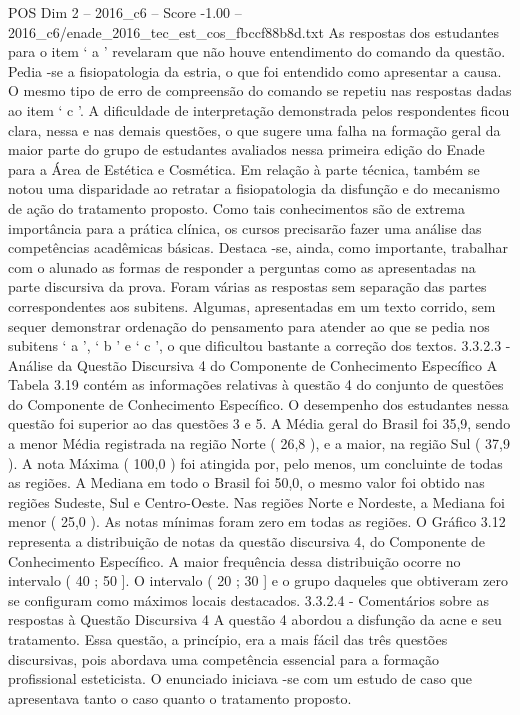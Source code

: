 \begin{textsample}{POS Dim 2 – 2016\_c6 – Score -1.00 – 2016\_c6/enade\_2016\_tec\_est\_cos\_fbccf88b8d.txt}
As respostas dos estudantes para o item ‘ a ’ revelaram que não houve entendimento do comando da questão.
Pedia -se a fisiopatologia da estria, o que foi entendido como apresentar a causa.
O mesmo tipo de erro de compreensão do comando se repetiu nas respostas dadas ao item ‘ c ’.
A dificuldade de interpretação demonstrada pelos respondentes ficou clara, nessa e nas demais questões, o que sugere uma falha na formação geral da maior parte do grupo de estudantes avaliados nessa primeira edição do Enade para a Área de Estética e Cosmética.
Em relação à parte técnica, também se notou uma disparidade ao retratar a fisiopatologia da disfunção e do mecanismo de ação do tratamento proposto.
Como tais conhecimentos são de extrema importância para a prática clínica, os cursos precisarão fazer uma análise das competências acadêmicas básicas.
Destaca -se, ainda, como importante, trabalhar com o alunado as formas de responder a perguntas como as apresentadas na parte discursiva da prova.
Foram várias as respostas sem separação das partes correspondentes aos subitens.
Algumas, apresentadas em um texto corrido, sem sequer demonstrar ordenação do pensamento para atender ao que se pedia nos subitens ‘ a ’, ‘ b ’ e ‘ c ’, o que dificultou bastante a correção dos textos. 3.3.2.3 - Análise da Questão Discursiva 4 do Componente de Conhecimento Específico A Tabela 3.19 contém as informações relativas à questão 4 do conjunto de questões do Componente de Conhecimento Específico.
O desempenho dos estudantes nessa questão foi superior ao das questões 3 e 5.
A Média geral do Brasil foi 35,9, sendo a menor Média registrada na região Norte ( 26,8 ), e a maior, na região Sul ( 37,9 ).
A nota Máxima ( 100,0 ) foi atingida por, pelo menos, um concluinte de todas as regiões.
A Mediana em todo o Brasil foi 50,0, o mesmo valor foi obtido nas regiões Sudeste, Sul e Centro-Oeste.
Nas regiões Norte e Nordeste, a Mediana foi menor ( 25,0 ).
As notas mínimas foram zero em todas as regiões.
O Gráfico 3.12 representa a distribuição de notas da questão discursiva 4, do Componente de Conhecimento Específico.
A maior frequência dessa distribuição ocorre no intervalo ( 40 ; 50 ].
O intervalo ( 20 ; 30 ] e o grupo daqueles que obtiveram zero se configuram como máximos locais destacados. 3.3.2.4 - Comentários sobre as respostas à Questão Discursiva 4 A questão 4 abordou a disfunção da acne e seu tratamento.
Essa questão, a princípio, era a mais fácil das três questões discursivas, pois abordava uma competência essencial para a formação profissional esteticista.
O enunciado iniciava -se com um estudo de caso que apresentava tanto o caso quanto o tratamento proposto.

\end{textsample}
